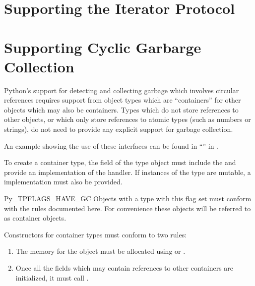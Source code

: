 \section{Supporting the Iterator Protocol
         \label{supporting-iteration}}


\section{Supporting Cyclic Garbarge Collection
         \label{supporting-cycle-detection}}

Python's support for detecting and collecting garbage which involves
circular references requires support from object types which are
``containers'' for other objects which may also be containers.  Types
which do not store references to other objects, or which only store
references to atomic types (such as numbers or strings), do not need
to provide any explicit support for garbage collection.

An example showing the use of these interfaces can be found in
``'' in
.

To create a container type, the  field of the type
object must include the  and provide an
implementation of the  handler.  If instances of the
type are mutable, a  implementation must also be
provided.

\begin{datadesc}{Py_TPFLAGS_HAVE_GC}
  Objects with a type with this flag set must conform with the rules
  documented here.  For convenience these objects will be referred to
  as container objects.
\end{datadesc}

Constructors for container types must conform to two rules:

\begin{enumerate}
\item  The memory for the object must be allocated using
        or .

\item  Once all the fields which may contain references to other
       containers are initialized, it must call
       .
\end{enumerate}

